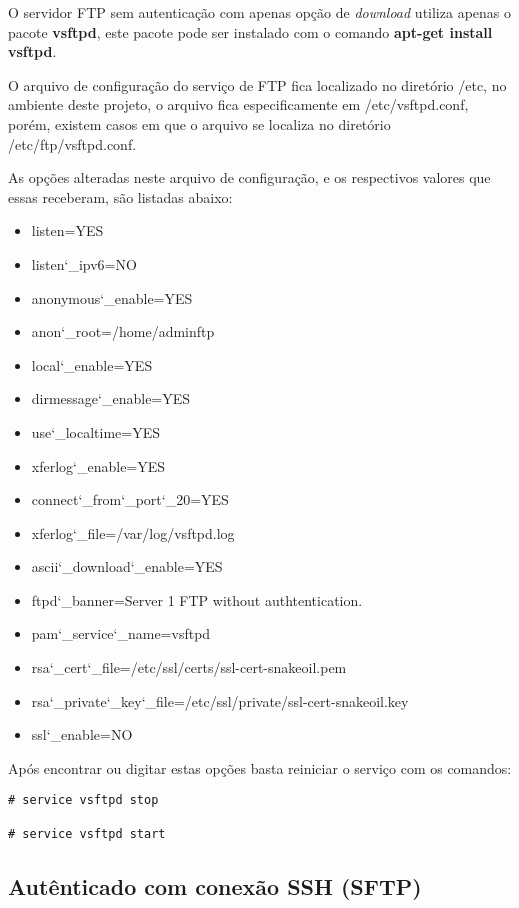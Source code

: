 \documentclass[
	12pt,				%
	openright,			%
	twoside,			%
	openany,			%
	a4paper,			%
	chapter=TITLE,		%
	section=TITLE,		%
	subsection=TITLE,	%
	subsubsection=TITLE,%
	english,
	brazil				%
]{abntex2}
\begin{document}
O servidor FTP sem autenticação com apenas opção de \textit{download} utiliza apenas o pacote \textbf{vsftpd}, este pacote pode ser instalado com o comando \textbf{apt-get install vsftpd}.

O arquivo de configuração do serviço de FTP fica localizado no diretório /etc, no ambiente deste projeto, o arquivo fica especificamente em /etc/vsftpd.conf, porém, existem casos em que o arquivo se localiza no diretório /etc/ftp/vsftpd.conf.

As opções alteradas neste arquivo de configuração, e os respectivos valores que essas receberam, são listadas abaixo:

\begin{itemize}
	\item listen=YES
	\item listen\char`_ipv6=NO
	\item anonymous\char`_enable=YES
	\item anon\char`_root=/home/adminftp
	\item local\char`_enable=YES
	\item dirmessage\char`_enable=YES
	\item use\char`_localtime=YES
	\item xferlog\char`_enable=YES
	\item connect\char`_from\char`_port\char`_20=YES
	\item xferlog\char`_file=/var/log/vsftpd.log
	\item ascii\char`_download\char`_enable=YES
	\item ftpd\char`_banner=Server 1 FTP without authtentication.
	\item pam\char`_service\char`_name=vsftpd
	\item rsa\char`_cert\char`_file=/etc/ssl/certs/ssl-cert-snakeoil.pem
	\item rsa\char`_private\char`_key\char`_file=/etc/ssl/private/ssl-cert-snakeoil.key
	\item ssl\char`_enable=NO
\end{itemize}

Após encontrar ou digitar estas opções basta reiniciar o serviço com os comandos:

\begin{lstlisting}
# service vsftpd stop

# service vsftpd start
\end{lstlisting}


\subsection{Autênticado com conexão SSH (SFTP)}
\end{document}
